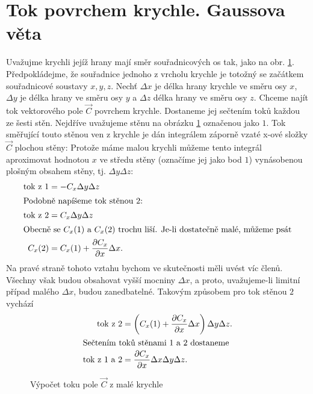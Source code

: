  \section{Tok povrchem krychle. Gaussova věta}
    Uvažujme krychli jejíž hrany mají směr souřadnicových os tak, jako na obr. 
    \ref{FYZ:fig_cube_gauss01}. Předpokládejme, že souřadnice jednoho z vrcholu krychle je totožný 
    se začátkem souřadnicové soustavy $x,y,z$. Nechť $\Delta x$ je délka hrany krychle ve směru osy 
    $x$, $\Delta y$ je délka hrany ve směru osy $y$ a $\Delta z$ délka hrany ve směru osy $z$. 
    Chceme najít tok vektorového pole \(\vec{C}\) povrchem krychle. Dostaneme jej sečtením toků 
    každou ze šesti stěn. Nejdříve uvažujeme stěnu na obrázku \ref{FYZ:fig_cube_gauss01} označenou 
    jako $1$. Tok směřující touto stěnou ven z krychle je dán integrálem záporně vzaté x-ové složky 
    \(\vec{C}\) plochou stěny: Protože máme malou krychli můžeme tento integrál aproximovat hodnotou 
    $x$ ve středu stěny (označíme jej jako bod $1$) vynásobenou plošným obsahem stěny, tj. $\Delta y 
    \Delta z$:        
    \begin{align}
      \text{tok z 1} &= -C_x\Delta y \Delta z                                           \\
      \intertext{Podobně napíšeme tok stěnou $2$:}
      \text{tok z 2} &= C_x\Delta y \Delta z                                            \\
      \intertext{Obecně se $C_x(1)$ a $C_x(2)$ trochu liší. Je-li dostatečně malé, můžeme psát}
       C_x(2)        &= C_x(1) + \frac{\partial C_x}{\partial x}\Delta x.                             
    \end{align}            
    \noindent Na pravé straně tohoto vztahu bychom ve skutečnosti měli uvést víc členů. Všechny však 
    budou obsahovat vyšší mocniny $\Delta x$, a proto, uvažujeme-li limitní případ malého $\Delta 
    x$, budou zanedbatelné. Takovým způsobem pro tok stěnou $2$ vychází
    \begin{align}    
      \text{tok z 2} &= \left(C_x(1) + \frac{\partial C_x}{\partial x}\Delta x\right)\Delta y \Delta z.             \\
      \intertext{Sečtením toků stěnami $1$ a $2$ dostaneme}
      \text{tok z 1 a 2} &= \frac{\partial C_x}{\partial x}\Delta x\Delta y\Delta z.
    \end{align}      
    
    \begin{figure}
      \centering
      
      \caption{Výpočet toku pole \(\vec{C}\) z malé krychle}
      \label{FYZ:fig_cube_gauss01}
    \end{figure}
    
